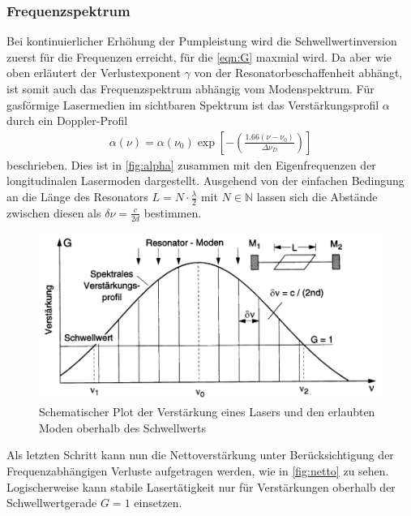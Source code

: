 \subsubsection{Frequenzspektrum}
Bei kontinuierlicher Erhöhung der Pumpleistung wird die Schwellwertinversion zuerst für die Frequenzen erreicht, für die \autoref{eqn:G} maxmial wird.
Da aber wie oben erläutert der Verlustexponent $\gamma$ von der Resonatorbeschaffenheit abhängt, ist somit auch das Frequenzspektrum abhängig vom Modenspektrum.
Für gasförmige Lasermedien im sichtbaren Spektrum ist das Verstärkungsprofil $\alpha$ durch ein Doppler-Profil 
\begin{align}
    \alpha(\nu)=\alpha(\nu_0)\exp{\left[-\left(\frac{1.66(\nu-\nu_0)}{\Delta\nu_D}\right)\right]}
\end{align}
beschrieben. Dies ist in \autoref{fig:alpha} zusammen mit den Eigenfrequenzen der longitudinalen Lasermoden dargestellt. Ausgehend von der einfachen Bedingung an die Länge des Resonators $L = N\cdot\frac{\lambda}{2}$ mit $N\in\mathbb{N}$ lassen sich die Abstände zwischen diesen als $\delta\nu=\frac{c}{2d}$ bestimmen.
\begin{figure}[H]
    \centering
    \includegraphics[scale=0.5]{Ressourcen/alpha.png}
    \caption{Schematischer Plot der Verstärkung eines Lasers und den erlaubten Moden oberhalb des Schwellwerts\cite{Demtroeder}}\label{fig:alpha}
\end{figure}
Als letzten Schritt kann nun die Nettoverstärkung unter Berücksichtigung der Frequenzabhängigen Verluste aufgetragen werden, wie in \autoref{fig:netto} zu sehen. Logischerweise kann stabile Lasertätigkeit nur für Verstärkungen oberhalb der Schwellwertgerade $G=1$ einsetzen.

